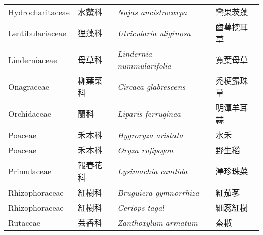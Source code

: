 {\begin{longtable}{p{3cm}p{2cm}p{5cm}p{3cm}}
    Hydrocharitaceae & 水鱉科 & \textit{Najas ancistrocarpa}  \index{Najas@\textit{Najas}!ancistrocarpa@\textit{ancistrocarpa}}   & 彎果茨藻 \index{彎果茨藻} \\
    Lentibulariaceae & 狸藻科 & \textit{Utricularia uliginosa}  \index{Utricularia@\textit{Utricularia}!uliginosa@\textit{uliginosa}} & 齒萼挖耳草 \index{齒萼挖耳草} \\
    Linderniaceae & 母草科 & \textit{Lindernia nummularifolia}  \index{Lindernia@\textit{Lindernia}!nummularifolia@\textit{nummularifolia}} & 寬葉母草 \index{寬葉母草} \\
    Onagraceae & 柳葉菜科 & \textit{Circaea glabrescens}  \index{Circaea@\textit{Circaea}!glabrescens@\textit{glabrescens}}       & 禿梗露珠草 \index{禿梗露珠草} \\
    Orchidaceae & 蘭科 & \textit{Liparis ferruginea}  \index{Liparis@\textit{Liparis}!ferruginea@\textit{ferruginea}}           & 明潭羊耳蒜 \index{明潭羊耳蒜} \\
    Poaceae & 禾本科 & \textit{Hygroryza aristata}  \index{Hygroryza@\textit{Hygroryza}!aristata@\textit{aristata}}             & 水禾 \index{水禾} \\
    Poaceae & 禾本科 & \textit{Oryza rufipogon}  \index{Oryza@\textit{Oryza}!rufipogon@\textit{rufipogon}}                & 野生稻 \index{野生稻} \\
    Primulaceae & 報春花科 & \textit{Lysimachia candida}  \index{Lysimachia@\textit{Lysimachia}!candida@\textit{candida}}       & 澤珍珠菜 \index{澤珍珠菜} \\
    Rhizophoraceae & 紅樹科 & \textit{Bruguiera gymnorrhiza}  \index{Bruguiera@\textit{Bruguiera}!gymnorrhiza@\textit{gymnorrhiza}}   & 紅茄苳 \index{紅茄苳} \\
    Rhizophoraceae & 紅樹科 & \textit{Ceriops tagal}  \index{Ceriops@\textit{Ceriops}!tagal@\textit{tagal}}           & 細蕊紅樹 \index{細蕊紅樹} \\
    Rutaceae & 芸香科 & \textit{Zanthoxylum armatum}  \index{Zanthoxylum@\textit{Zanthoxylum}!armatum@\textit{armatum}}           & 秦椒 \index{秦椒} \\
    \bottomrule
    \end{longtable}
}